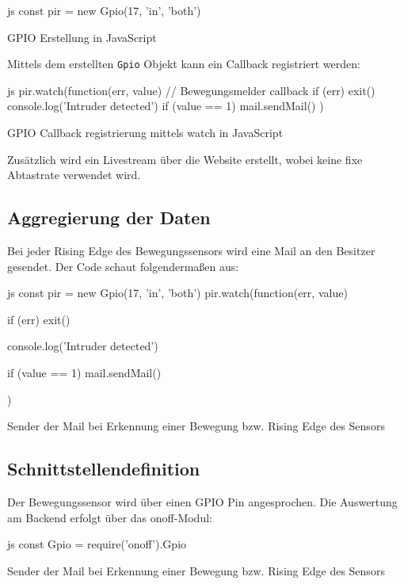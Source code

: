 \begin{listing}
    \begin{code}{js}
    const pir = new Gpio(17, 'in', 'both')
    \end{code}
    \caption{GPIO Erstellung in JavaScript}
\end{listing}

Mittels dem erstellten \texttt{Gpio} Objekt kann ein Callback registriert werden:

\begin{listing}
    \begin{code}[firstnumber=last]{js}
    pir.watch(function(err, value) {
        // Bewegungsmelder callback
        if (err) exit()
        console.log('Intruder detected')
        if (value == 1) {
            mail.sendMail()
        }
    })
    \end{code}
    \caption{GPIO Callback registrierung mittels watch in JavaScript}
\end{listing}

Zusätzlich wird ein Livestream über die Website erstellt, wobei keine fixe Abtastrate verwendet wird.

\clearpage
\subsection{Aggregierung der Daten}
Bei jeder Rising Edge des Bewegungssensors wird eine Mail an den Besitzer gesendet. Der Code schaut folgendermaßen aus:
\begin{listing}
    \begin{code}[firstnumber=last]{js}
    const pir = new Gpio(17, 'in', 'both')
    pir.watch(function(err, value) {
        if (err) exit()

        console.log('Intruder detected')

        if (value == 1) {
            mail.sendMail()
        }
    })
    \end{code}
    \caption{Sender der Mail bei Erkennung einer Bewegung bzw. Rising Edge des Sensors}
\end{listing}

\subsection{Schnittstellendefinition}
Der Bewegungssensor wird über einen GPIO Pin angesprochen. Die Auswertung am Backend erfolgt über das onoff-Modul:
\begin{listing}
    \begin{code}[firstnumber=last]{js}
        const Gpio = require('onoff').Gpio
    \end{code}
    \caption{Sender der Mail bei Erkennung einer Bewegung bzw. Rising Edge des Sensors}
\end{listing}
